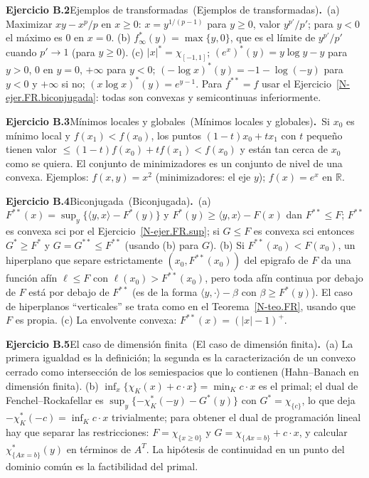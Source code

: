 \documentclass[11pt,a4paper]{amsart}
\newcommand{\R}{{\mathbb R}}
\theoremstyle{remark}
\theoremstyle{definition}
\numberwithin{subsection}{section}
\numberwithin{equation}{section}
\newcommand{\ejlabel}[2]{\par\medskip\noindent\textbf{Ejercicio #1}\ifx\relax#2\relax\else\ (#2)\fi\textbf{.}\ }
\begin{document}
\ejlabel{B.2}{Ejemplos de transformadas}(a) Maximizar $xy-x^p/p$ en $x\ge0$: $x=y^{1/(p-1)}$ para $y\ge0$, valor $y^{p'}/p'$; para $y<0$ el máximo es $0$ en $x=0$. (b) $f_\infty^*(y)=\max\{y,0\}$, que es el límite de $y^{p'}/p'$ cuando $p'\to1$ (para $y\ge0$). (c) $|x|^*=\chi_{[-1,1]}$; $(e^x)^*(y)=y\log y-y$ para $y>0$, $0$ en $y=0$, $+\infty$ para $y<0$; $(-\log x)^*(y)=-1-\log(-y)$ para $y<0$ y $+\infty$ si no; $(x\log x)^*(y)=e^{y-1}$. Para $f^{**}=f$ usar el Ejercicio~\ref{N-ejer.FR.biconjugada}: todas son convexas y semicontinuas inferiormente.

\ejlabel{B.3}{Mínimos locales y globales}Si $x_0$ es mínimo local y $f(x_1)<f(x_0)$, los puntos $(1-t)x_0+tx_1$ con $t$ pequeño tienen valor $\le(1-t)f(x_0)+tf(x_1)<f(x_0)$ y están tan cerca de $x_0$ como se quiera. El conjunto de minimizadores es un conjunto de nivel de una convexa. Ejemplos: $f(x,y)=x^2$ (minimizadores: el eje $y$); $f(x)=e^x$ en $\R$.

\ejlabel{B.4}{Biconjugada}(a) $F^{**}(x)=\sup_y\{\langle y,x\rangle-F^*(y)\}$ y $F^*(y)\ge\langle y,x\rangle-F(x)$ dan $F^{**}\le F$; $F^{**}$ es convexa sci por el Ejercicio~\ref{N-ejer.FR.sup}; si $G\le F$ es convexa sci entonces $G^*\ge F^*$ y $G=G^{**}\le F^{**}$ (usando (b) para $G$). (b) Si $F^{**}(x_0)<F(x_0)$, un hiperplano que separe estrictamente $(x_0,F^{**}(x_0))$ del epigrafo de $F$ da una función afín $\ell\le F$ con $\ell(x_0)>F^{**}(x_0)$, pero toda afín continua por debajo de $F$ está por debajo de $F^{**}$ (es de la forma $\langle y,\cdot\rangle-\beta$ con $\beta\ge F^*(y)$). El caso de hiperplanos ``verticales'' se trata como en el Teorema~\ref{N-teo.FR}, usando que $F$ es propia. (c) La envolvente convexa: $F^{**}(x)=(|x|-1)^+$.

\ejlabel{B.5}{El caso de dimensión finita}(a) La primera igualdad es la definición; la segunda es la caracterización de un convexo cerrado como intersección de los semiespacios que lo contienen (Hahn--Banach en dimensión finita). (b) $\inf_x\{\chi_K(x)+c\cdot x\}=\min_Kc\cdot x$ es el primal; el dual de Fenchel--Rockafellar es $\sup_y\{-\chi_K^*(-y)-G^*(y)\}$ con $G^*=\chi_{\{c\}}$, lo que deja $-\chi_K^*(-c)=\inf_Kc\cdot x$ trivialmente; para obtener el dual de programación lineal hay que separar las restricciones: $F=\chi_{\{x\ge0\}}$ y $G=\chi_{\{Ax=b\}}+c\cdot x$, y calcular $\chi_{\{Ax=b\}}^*(y)$ en términos de $A^T$. La hipótesis de continuidad en un punto del dominio común es la factibilidad del primal.
\end{document}
